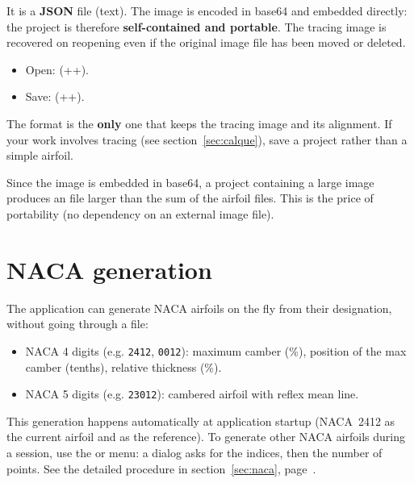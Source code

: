 It is a \textbf{JSON} file (text). The image is encoded
in base64 and embedded directly: the project is therefore
\textbf{self-contained and portable}. The tracing image is recovered
on reopening even if the original image file has been moved or
deleted.

\begin{itemize}
    \item Open: 
        (++).
    \item Save:  (++).
\end{itemize}

\begin{important}
The  format is the \textbf{only} one that keeps
the tracing image and its alignment. If your work involves
tracing (see section~\ref{sec:calque}), save a project
rather than a simple airfoil.
\end{important}

\begin{noteinfo}
Since the image is embedded in base64, a project containing a large
image produces an  file larger than the
sum of the airfoil files. This is the price of portability
(no dependency on an external image file).
\end{noteinfo}

\section{NACA generation}

The application can generate NACA airfoils on the fly from
their designation, without going through a file:

\begin{itemize}
    \item NACA 4 digits (e.g. \texttt{2412}, \texttt{0012}):
        maximum camber (\%), position of the max camber
        (tenths), relative thickness (\%).
    \item NACA 5 digits (e.g. \texttt{23012}): cambered airfoil
        with reflex mean line.
\end{itemize}

This generation happens automatically at application
startup (NACA~2412 as the current airfoil and as the reference).
To generate other NACA airfoils during a session, use the
 or  menu: a dialog
asks for the indices, then the number of points. See the detailed
procedure in section~\ref{sec:naca}, page~\pageref{sec:naca}.

